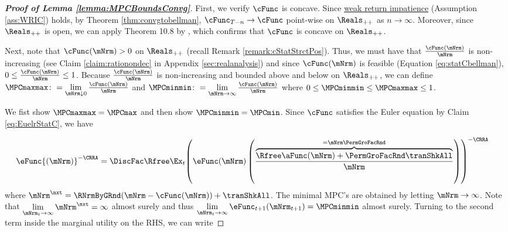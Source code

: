 \documentclass[\econtexRoot/BufferStockTheory]{subfiles}
\begin{document}
\begin{proof}[\textbf{Proof of Lemma \ref{lemma:MPCBoundsConvg}}]

First, we verify $\cFunc$ is concave. Since \hyperlink{WRIC}{weak return impatience} (Assumption \ref{ass:WRIC}) holds, by Theorem \ref{thm:convgtobellman}, $\cFunc_{T-n}\rightarrow \cFunc$ point-wise on $\Reals_{++}$ as $n\rightarrow \infty$. Moreover, since $\Reals_{++}$ is open, we can apply Theorem 10.8 by \cite{Rockafellar1972}, which confirms that $\cFunc$ is concave on $\Reals_{++}$.

Next, note that $\cFunc(\mNrm)>0$ on $\Reals_{++}$ (recall Remark \ref{remark:cStatStrctPos}). Thus, we must have that $\frac{\cFunc(\mNrm)}{\mNrm}$ is non-increasing (see Claim \ref{claim:rationondec} in Appendix \ref{sec:realanalysis}) and since  $\cFunc(\mNrm)$ is feasible (Equation \ref{eq:statCbellman}), $0 \leq \frac{\cFunc(\mNrm)}{\mNrm}\leq 1$. Because $\frac{\cFunc(\mNrm)}{\mNrm}$ is non-increasing and bounded above and below on $\Reals_{++}$, we can define $\MPCmaxmax\colon = \lim\limits_{\mNrm\downarrow 0}\frac{\cFunc(\mNrm)}{\mNrm}$ and $\MPCminmin \colon= \lim\limits_{\mNrm\rightarrow \infty}\frac{\cFunc(\mNrm)}{\mNrm}$ where $0 \leq \MPCminmin \leq \MPCmaxmax\leq 1$. 

We fist show $\MPCmaxmax = \MPCmax$ and then show $\MPCminmin = \MPCmin$. Since $\cFunc$ satisfies the Euler equation by Claim \ref{eq:EuelrStatC}, we have

\begin{equation}\begin{gathered}\begin{aligned}\label{eq:eFuncEulerStat}
 \eFunc{(\mNrm)}^{-\CRRA}  & = \DiscFac \Rfree \Ex_{t}{\left(\eFunc({\mNrm})\left(\frac{\overbrace{\Rfree \aFunc(\mNrm)+{\PermGroFacRnd}{\tranShkAll}}^{={\mNrm} \PermGroFacRnd}}{\mNrm}\right)\right)}^{-\CRRA }
\end{aligned}\end{gathered}\end{equation}
%
where ${\mNrm}^{\nxt} = \RNrmByGRnd(\mNrm -\cFunc(\mNrm)) +\tranShkAll$. The minimal MPC's are obtained by letting $\mNrm \rightarrow \infty$.
Note that $\lim\limits_{\mNrm_{t}\rightarrow \infty} \mNrm^{\nxt} = \infty$ almost surely and thus $\lim\limits_{\mNrm_{t}\rightarrow \infty}\eFunc_{t+1}({\mNrm}_{t+1}) = \MPCminmin$ almost surely.
Turning to the second term inside the marginal utility on the RHS, we can write


\end{proof}
\end{document}
